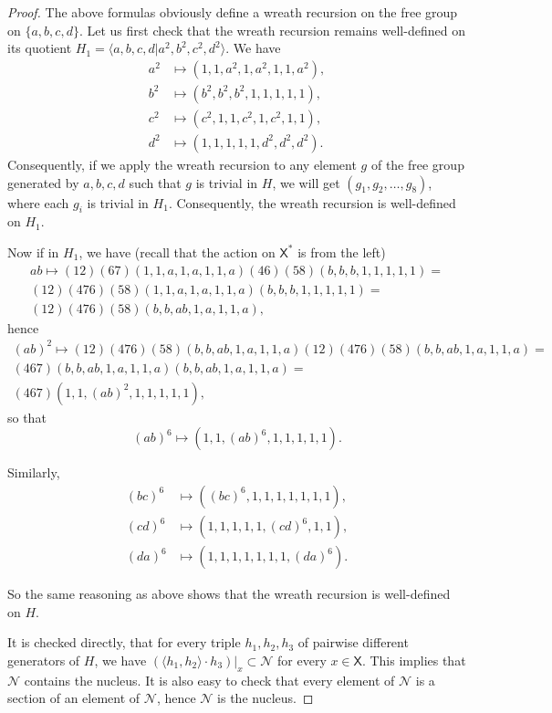 \documentclass[11pt]{amsart}
\newcommand{\xs}{\alb^\ast}
\newcommand{\alb}{\ensuremath{\mathsf{X}}}%
\newcommand{\nuke}{\ensuremath{\mathcal{N}}}%
\theoremstyle{definition}
\theoremstyle{plain}
\newtheorem{main thm}{Theorem}
\theoremstyle{remark}
\theoremstyle{plain}
\begin{document}
\begin{proof}
The above formulas obviously define a wreath recursion on the free group on $\{a, b, c, d\}$.  Let us first check that the wreath recursion remains well-defined on its quotient $H_1=\langle a, b, c, d | a^2, b^2, c^2, d^2\rangle$. We have
\begin{align*}
a^2 &\mapsto (1, 1, a^2, 1, a^2, 1, 1, a^2),\\
b^2 &\mapsto (b^2, b^2, b^2, 1, 1, 1, 1, 1),\\
c^2 &\mapsto (c^2, 1, 1, c^2, 1, c^2, 1, 1),\\
d^2 &\mapsto (1, 1, 1, 1, 1, d^2, d^2, d^2).
\end{align*}
Consequently, if we apply the wreath recursion to any element $g$ of the free group generated by $a, b, c, d$ such that $g$ is trivial in $H$, we will get $(g_1, g_2, \ldots, g_8)$, where each $g_i$ is trivial in $H_1$. Consequently, the wreath recursion is well-defined on $H_1$. 

Now if in $H_1$, we have (recall that the action on $\xs$ is from the left)
\begin{multline*}
ab\mapsto (12)(67)(1, 1, a, 1, a, 1, 1, a)(46)(58)(b, b, b, 1, 1, 1, 1, 1)=\\
(12)(476)(58)(1, 1, a, 1, a, 1, 1, a)(b, b, b, 1, 1, 1, 1, 1)=\\
(12)(476)(58)(b, b, ab, 1, a, 1, 1, a),
\end{multline*}
hence
\begin{multline*}
    (ab)^2\mapsto (12)(476)(58)(b, b, ab, 1, a, 1, 1, a)(12)(476)(58)(b, b, ab, 1, a, 1, 1, a)=\\
    (467)(b, b, ab, 1, a, 1, 1, a)(b, b, ab, 1, a, 1, 1, a)=\\
    (467)(1, 1, (ab)^2, 1, 1, 1, 1, 1),
\end{multline*}
so that
\[(ab)^6\mapsto (1, 1, (ab)^6, 1, 1, 1, 1, 1).\]

Similarly, 
\begin{align*}
    (bc)^6 &\mapsto ((bc)^6, 1, 1, 1, 1, 1, 1, 1),\\
    (cd)^6 &\mapsto (1, 1, 1, 1, 1, (cd)^6, 1, 1),\\
    (da)^6 &\mapsto (1, 1, 1, 1, 1, 1, 1, (da)^6).
\end{align*}

So the same reasoning as above shows that the wreath recursion is well-defined on $H$.

It is checked directly, that for every triple $h_1, h_2, h_3$ of pairwise different generators of $H$, we have $(\langle h_1, h_2\rangle\cdot h_3)|_x\subset\nuke$ for every $x\in\alb$. This implies that $\nuke$ contains the nucleus. It is also easy to check that every element of $\nuke$ is a section of an element of $\nuke$, hence $\nuke$ is the nucleus.
\end{proof}
\end{document}
